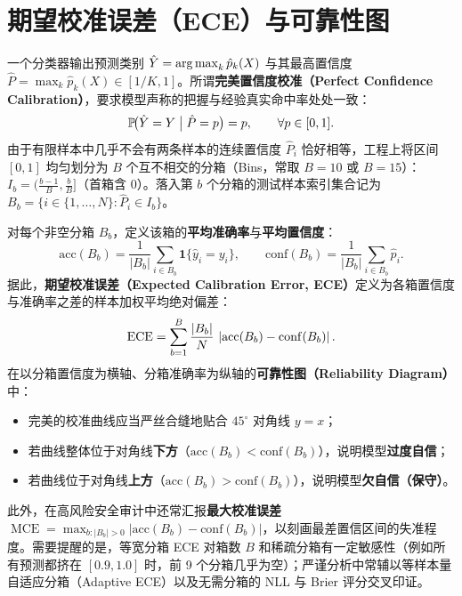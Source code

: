 \section{期望校准误差（ECE）与可靠性图}

一个分类器输出预测类别 $\hat{Y} = \operatorname*{arg\,max}_k \hat{p}_k(X)$ 与其最高置信度 $\hat{P} = \max_k \hat{p}_k(X) \in [1/K, 1]$。所谓\textbf{完美置信度校准（Perfect Confidence Calibration）}，要求模型声称的把握与经验真实命中率处处一致：
\begin{equation}\label{eq:perfect-calib}
  \mathbb{P}\!\big(\hat{Y} = Y \;\big|\; \hat{P} = p\big) = p, \qquad \forall p \in [0, 1].
\end{equation}
由于有限样本中几乎不会有两条样本的连续置信度 $\hat{P}_i$ 恰好相等，工程上将区间 $[0,1]$ 均匀划分为 $B$ 个互不相交的分箱（Bins，常取 $B=10$ 或 $B=15$）：$I_b = \big(\frac{b-1}{B}, \frac{b}{B}\big]$（首箱含 $0$）。落入第 $b$ 个分箱的测试样本索引集合记为 $B_b = \{i \in \{1,\dots,N\} : \hat{P}_i \in I_b\}$。

对每个非空分箱 $B_b$，定义该箱的\textbf{平均准确率}与\textbf{平均置信度}：
\[
  \mathrm{acc}(B_b) = \frac{1}{|B_b|}\sum_{i \in B_b} \mathbf{1}\{\hat{y}_i = y_i\},
  \qquad
  \mathrm{conf}(B_b) = \frac{1}{|B_b|}\sum_{i \in B_b} \hat{p}_i.
\]
据此，\textbf{期望校准误差（Expected Calibration Error, ECE）}定义为各箱置信度与准确率之差的样本加权平均绝对偏差：
\begin{equation}\label{eq:ece-def}
  \operatorname{ECE} = \sum_{b=1}^B \frac{|B_b|}{N}\,\left|\mathrm{acc}(B_b) - \mathrm{conf}(B_b)\right|.
\end{equation}
在以分箱置信度为横轴、分箱准确率为纵轴的\textbf{可靠性图（Reliability Diagram）}中：
\begin{itemize}
  \item 完美的校准曲线应当严丝合缝地贴合 $45^\circ$ 对角线 $y = x$；
  \item 若曲线整体位于对角线\textbf{下方}（$\mathrm{acc}(B_b) < \mathrm{conf}(B_b)$），说明模型\textbf{过度自信}；
  \item 若曲线位于对角线\textbf{上方}（$\mathrm{acc}(B_b) > \mathrm{conf}(B_b)$），说明模型\textbf{欠自信（保守）}。
\end{itemize}
此外，在高风险安全审计中还常汇报\textbf{最大校准误差} $\operatorname{MCE} = \max_{b:|B_b|>0} |\mathrm{acc}(B_b) - \mathrm{conf}(B_b)|$，以刻画最差置信区间的失准程度。需要提醒的是，等宽分箱 ECE 对箱数 $B$ 和稀疏分箱有一定敏感性（例如所有预测都挤在 $[0.9, 1.0]$ 时，前 9 个分箱几乎为空）；严谨分析中常辅以等样本量自适应分箱（Adaptive ECE）以及无需分箱的 NLL 与 Brier 评分交叉印证。

